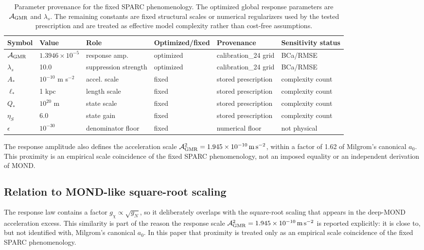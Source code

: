 ﻿\documentclass[twocolumn]{aastex701}
\begin{document}
\begin{table}[t]
\centering
\scriptsize
\setlength{\tabcolsep}{3pt}
\caption{Parameter provenance for the fixed SPARC phenomenology. The optimized global response parameters are $\mathcal{A}_{\rm GMR}$ and $\lambda_s$. The remaining constants are fixed structural scales or numerical regularizers used by the tested prescription and are treated as effective model complexity rather than cost-free assumptions.}
\begin{tabular*}{\textwidth}{@{\extracolsep{\fill}}llllll}
\hline
Symbol & Value & Role & Optimized/fixed & Provenance & Sensitivity status \\
\hline
$\mathcal{A}_{\rm GMR}$ & $1.3946\times10^{-5}$ & response amp. & optimized & calibration\_24 grid & BCa/RMSE \\
$\lambda_s$ & 10.0 & suppression strength & optimized & calibration\_24 grid & BCa/RMSE \\
$A_*$ & $10^{-10}$ m s$^{-2}$ & accel. scale & fixed & stored prescription & complexity count \\
$\ell_*$ & 1 kpc & length scale & fixed & stored prescription & complexity count \\
$Q_*$ & $10^{20}$ m & state scale & fixed & stored prescription & complexity count \\
$\eta_S$ & 6.0 & state gain & fixed & stored prescription & complexity count \\
$\epsilon$ & $10^{-30}$ & denominator floor & fixed & numerical floor & not physical \\
\hline
\end{tabular*}
\end{table}

The response amplitude also defines the acceleration scale $\mathcal{A}_{\rm GMR}^2 = 1.945\times10^{-10}\,{\rm m\,s^{-2}}$, within a factor of 1.62 of Milgrom's canonical $a_0$. This proximity is an empirical scale coincidence of the fixed SPARC phenomenology, not an imposed equality or an independent derivation of MOND.

\subsection{Relation to MOND-like square-root scaling}

The response law contains a factor $g_\chi\propto \sqrt{g_N}$, so it deliberately overlaps with the square-root scaling that appears in the deep-MOND acceleration excess. This similarity is part of the reason the response scale $\mathcal{A}_{\rm GMR}^2=1.945\times10^{-10}\,{\rm m\,s^{-2}}$ is reported explicitly: it is close to, but not identified with, Milgrom's canonical $a_0$. In this paper that proximity is treated only as an empirical scale coincidence of the fixed SPARC phenomenology.
\end{document}
